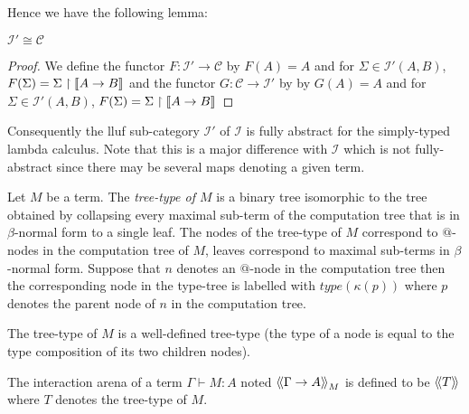 Hence we have the following lemma:
\begin{lem}
$\mathcal{I'} \cong \mathcal{C}$
\end{lem}
\begin{proof}
We define the functor $F:\mathcal{I'} \rightarrow \mathcal{C}$
by $F(A) = A$ and for $\Sigma \in \mathcal{I'}(A,B)$,
$F(\Sigma) = \Sigma \upharpoonright {[\![A\rightarrow B ]\!]}$
and the functor $G:\mathcal{C} \rightarrow \mathcal{I'}$ by
by $G(A) = A$ and for $\Sigma \in \mathcal{I'}(A,B)$,
$F(\Sigma) = \Sigma \upharpoonright {[\![A\rightarrow B ]\!]}$

\end{proof}

Consequently the lluf sub-category $\mathcal{I'}$ of $\mathcal{I}$ is fully abstract for the simply-typed lambda calculus.
Note that this is a major difference with $\mathcal{I}$ which is not fully-abstract since there may be several maps denoting a given
term.



\begin{dfn}
Let $M$ be a term. The \emph{tree-type of $M$} is a binary tree
isomorphic to the tree obtained by collapsing every maximal sub-term
of the computation tree that is in $\beta$-normal form to a single
leaf. The nodes of the tree-type of $M$ correspond to $@$-nodes in
the computation tree of $M$, leaves correspond to maximal sub-terms
in $\beta$-normal form. Suppose that $n$ denotes an $@$-node in the
computation tree then the corresponding node in the type-tree is
labelled with $type(\kappa(p))$ where $p$ denotes the parent node of
$n$ in the computation tree.
\end{dfn}
The tree-type of $M$ is a well-defined tree-type (the type of a node
is equal to the type composition of its two children nodes).

The interaction arena of a term $\Gamma \vdash M:A$ noted
${\langle\!\langle \Gamma \rightarrow A \rangle\!\rangle}_M$ is defined to be ${\langle\!\langle T \rangle\!\rangle}$
where $T$ denotes the tree-type of $M$.


